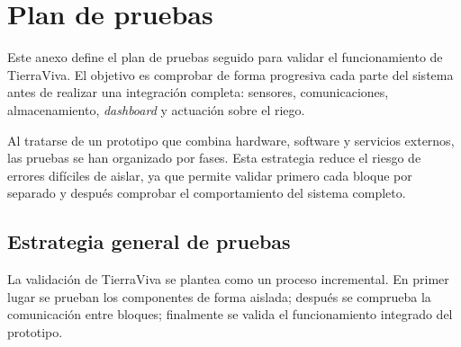 \chapter{Plan de pruebas}
\label{anexo:plan_pruebas}

Este anexo define el plan de pruebas seguido para validar el funcionamiento de TierraViva. El objetivo es comprobar de forma progresiva cada parte del sistema antes de realizar una integración completa: sensores, comunicaciones, almacenamiento, \textit{dashboard} y actuación sobre el riego.

Al tratarse de un prototipo que combina hardware, software y servicios externos, las pruebas se han organizado por fases. Esta estrategia reduce el riesgo de errores difíciles de aislar, ya que permite validar primero cada bloque por separado y después comprobar el comportamiento del sistema completo.

\section{Estrategia general de pruebas}

La validación de TierraViva se plantea como un proceso incremental. En primer lugar se prueban los componentes de forma aislada; después se comprueba la comunicación entre bloques; finalmente se valida el funcionamiento integrado del prototipo.

\begingroup
\small
\renewcommand{\arraystretch}{1.20}


